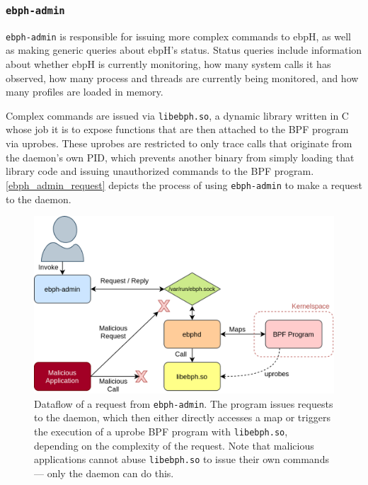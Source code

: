 \documentclass[
  12pt]{findlay}
\newcommand{\passthrough}[1]{#1}
\begin{document}

\hypertarget{ebph-admin}{%
\subsubsection{\texorpdfstring{\texttt{ebph-admin}}{ebph-admin}}\label{ebph-admin}}

\label{ebph_admin_sec}

\passthrough{\lstinline!ebph-admin!} is responsible for issuing more
complex commands to ebpH, as well as making generic queries about ebpH's
status. Status queries include information about whether ebpH is
currently monitoring, how many system calls it has observed, how many
process and threads are currently being monitored, and how many profiles
are loaded in memory.

Complex commands are issued via \passthrough{\lstinline!libebph.so!}, a
dynamic library written in C whose job it is to expose functions that
are then attached to the BPF program via uprobes. These uprobes are
restricted to only trace calls that originate from the daemon's own PID,
which prevents another binary from simply loading that library code and
issuing unauthorized commands to the BPF program.
\autoref{ebph_admin_request} depicts the process of using
\passthrough{\lstinline!ebph-admin!} to make a request to the daemon.

\begin{figure}
    \caption[Dataflow of a request from \texttt{ebph-admin}]{
        Dataflow of a request from \texttt{ebph-admin}.
        The program issues requests to the daemon, which then either
        directly accesses a map or triggers the execution of a uprobe
        BPF program with \texttt{libebph.so}, depending on the complexity
        of the request. Note that malicious applications cannot abuse \texttt{libebph.so}
        to issue their own commands --- only the daemon can do this.
    }
    \label{ebph_admin_request}
    \includegraphics[width=.8\textwidth]{../figures/ebph-admin.png}
\end{figure}
\end{document}
